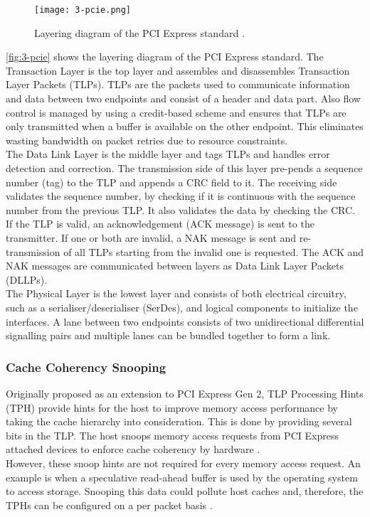 \begin{figure}[H]
  \centering
  \texttt{[image: 3-pcie.png]}
  \caption{Layering diagram of the PCI Express standard \cite{pcie-intel}.}
  \label{fig:3-pcie}
\end{figure}

\autoref{fig:3-pcie} shows the layering diagram of the PCI Express standard. The Transaction Layer is the top layer and assembles and disassembles Transaction Layer Packets (TLPs). TLPs are the packets used to communicate information and data between two endpoints and consist of a header and data part. Also flow control is managed by using a credit-based scheme and ensures that TLPs are only transmitted when a buffer is available on the other endpoint. This eliminates wasting bandwidth on packet retries due to resource constraints.\\
The Data Link Layer is the middle layer and tags TLPs and handles error detection and correction. The transmission side of this layer pre-pends a sequence number (tag) to the TLP and appends a CRC field to it. The receiving side validates the sequence number, by checking if it is continuous with the sequence number from the previous TLP. It also validates the data by checking the CRC. If the TLP is valid, an acknowledgement (ACK message) is sent to the transmitter. If one or both are invalid, a NAK message is sent and re-transmission of all TLPs starting from the invalid one is requested. The ACK and NAK messages are communicated between layers as Data Link Layer Packets (DLLPs).\\
The Physical Layer is the lowest layer and consists of both electrical circuitry, such as a serialiser/deserialiser (SerDes), and logical components to initialize the interfaces. A lane between two endpoints consists of two unidirectional differential signalling pairs and multiple lanes can be bundled together to form a link.



\subsubsection{Cache Coherency Snooping}
Originally proposed as an extension to PCI Express Gen 2, TLP Processing Hints (TPH) \cite{pcie-tph} provide hints for the host to improve memory access performance by taking the cache hierarchy into consideration. This is done by providing several bits in the TLP. The host snoops memory access requests from PCI Express attached devices to enforce cache coherency by hardware \cite{pcie3}.\\
However, these snoop hints are not required for every memory access request. An example is when a speculative read-ahead buffer is used by the operating system to access storage. Snooping this data could pollute host caches and, therefore, the TPHs can be configured on a per packet basis \cite{pcie3-intel}.

